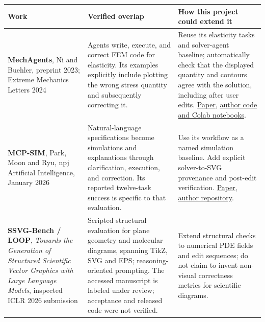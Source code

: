 \documentclass[
  11pt,
  a4paper,
]{article}
\newcounter{none} %
\begin{document}
{\def\LTcaptype{none} %
\begin{longtable}[]{@{}
  >{\raggedright\arraybackslash}p{}
  >{\raggedright\arraybackslash}p{}
  >{\raggedright\arraybackslash}p{}@{}}
\toprule\noalign{}
\begin{minipage}[b]{\linewidth}\raggedright
Work
\end{minipage} & \begin{minipage}[b]{\linewidth}\raggedright
Verified overlap
\end{minipage} & \begin{minipage}[b]{\linewidth}\raggedright
How this project could extend it
\end{minipage} \\
\midrule\noalign{}
\endhead
\bottomrule\noalign{}
\endlastfoot
\textbf{MechAgents}, Ni and Buehler, preprint 2023; Extreme Mechanics
Letters 2024 & Agents write, execute, and correct FEM code for
elasticity. Its examples explicitly include plotting the wrong stress
quantity and subsequently correcting it. & Reuse its elasticity tasks
and solver-agent baseline; automatically check that the displayed
quantity and contours agree with the solution, including after user
edits. \href{https://arxiv.org/abs/2311.08166}{Paper},
\href{https://github.com/lamm-mit/MechAgents}{author code and Colab
notebooks}. \\
\textbf{MCP-SIM}, Park, Moon and Ryu, npj Artificial Intelligence,
January 2026 & Natural-language specifications become simulations and
explanations through clarification, execution, and correction. Its
reported twelve-task success is specific to that evaluation. & Use its
workflow as a named simulation baseline. Add explicit solver-to-SVG
provenance and post-edit verification.
\href{https://www.nature.com/articles/s44387-025-00057-z}{Paper},
\href{https://github.com/KAIST-M4/MCP-SIM}{author repository}. \\
\textbf{SSVG-Bench / LOOP}, \emph{Towards the Generation of Structured
Scientific Vector Graphics with Large Language Models}, inspected ICLR
2026 submission & Scripted structural evaluation for plane geometry and
molecular diagrams, spanning TikZ, SVG and EPS; reasoning-oriented
prompting. The accessed manuscript is labeled under review; acceptance
and released code were not verified. & Extend structural checks to
numerical PDE fields and edit sequences; do not claim to invent
non-visual correctness metrics for scientific diagrams.

\end{longtable}}
\end{document}
